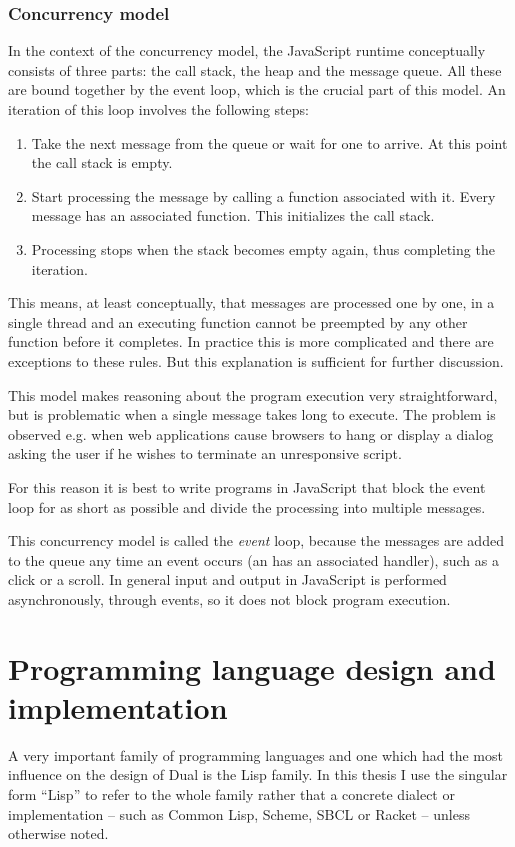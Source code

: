 \subsubsection{Concurrency model}
In the context of the concurrency model, the JavaScript runtime conceptually
consists of three parts: the call stack, the heap and the message queue. All
these are bound together by the event loop\cite{mdn_concurrency}, which is the crucial part of this model.  An iteration of this loop involves the following steps:
\begin{enumerate}
	\item Take the next message from the queue or wait for one to arrive. At
          this point the call stack is empty.
	\item Start processing the message by calling a function associated with
          it. Every message has an associated function. This initializes the
          call stack.
	\item Processing stops when the stack becomes empty again, thus
          completing the iteration.
\end{enumerate}

This means, at least conceptually, that messages are processed one by one, in a single thread and an executing function cannot be preempted by any other function before it completes. In practice this is more complicated and there are exceptions to these rules. But this explanation is sufficient for further discussion.

This model makes reasoning about the program execution very straightforward, but
is problematic when a single message takes long to execute. The problem is
observed e.g. when web applications cause browsers to hang or display a
dialog asking the user if he wishes to terminate an unresponsive script.

For this reason it is best to write programs in JavaScript that block the event
loop for as short as possible and divide the processing into multiple messages.

This concurrency model is called the \textit{event} loop, because the messages are added to the queue any time an event occurs (an has an associated handler), such as a click or a scroll. In general input and output in JavaScript is performed asynchronously, through events, so it does not block program execution.

\section{Programming language design and implementation}\label{sec:lisp}
A very important family of programming languages and one which had the most
influence on the design of Dual is the Lisp family. In this thesis I use the
singular form ``Lisp'' to refer to the whole family rather that a concrete
dialect or implementation -- such as Common Lisp\cite{common_lisp_hyperspec}, Scheme\cite{r7rs}, SBCL\cite{sbcl_site} or Racket\cite{racket_site} -- unless otherwise noted.

